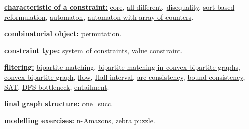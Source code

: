 \begin{ctrdesc}
\item[\pdfmarkup{subject={Keywords},color=white,markup=Highlight}{Keywords}{Related keywords grouped by meta-keywords.}
]
\hyperlink{characteristic_of_a_constraint}{{\bf characteristic of a constraint:}}
\hyperlink{core}{core},
\hyperlink{all_different}{all different},
\hyperlink{disequality}{disequality},
\hyperlink{sort_based_reformulation}{sort based reformulation},
\hyperlink{automaton}{automaton},
\hyperlink{automaton_with_array_of_counters}{automaton with array of counters}.
 
\hyperlink{combinatorial_object}{{\bf combinatorial object:}}
\hyperlink{permutation}{permutation}.
 
\hyperlink{constraint_type}{{\bf constraint type:}}
\hyperlink{system_of_constraints}{system of constraints},
\hyperlink{value_constraint}{value constraint}.
 
\hyperlink{filtering}{{\bf filtering:}}
\hyperlink{bipartite_matching}{bipartite matching},
\hyperlink{bipartite_matching_in_convex_bipartite_graphs}{bipartite matching in convex bipartite graphs},
\hyperlink{convex_bipartite_graph}{convex bipartite graph},
\hyperlink{flow}{flow},
\hyperlink{Hall_interval}{Hall interval},
\hyperlink{arc-consistency}{arc-consistency},
\hyperlink{bound-consistency}{bound-consistency},
\hyperlink{SAT}{SAT},
\hyperlink{DFS-bottleneck}{DFS-bottleneck},
\hyperlink{entailment}{entailment}.
 
\hyperlink{final_graph_structure}{{\bf final graph structure:}}
\hyperlink{one_succ}{one\_succ}.
 
\hyperlink{modelling_exercises}{{\bf modelling exercises:}}
\hyperlink{n-Amazons}{n-Amazons},
\hyperlink{zebra_puzzle}{zebra puzzle}.
 

\end{ctrdesc}
